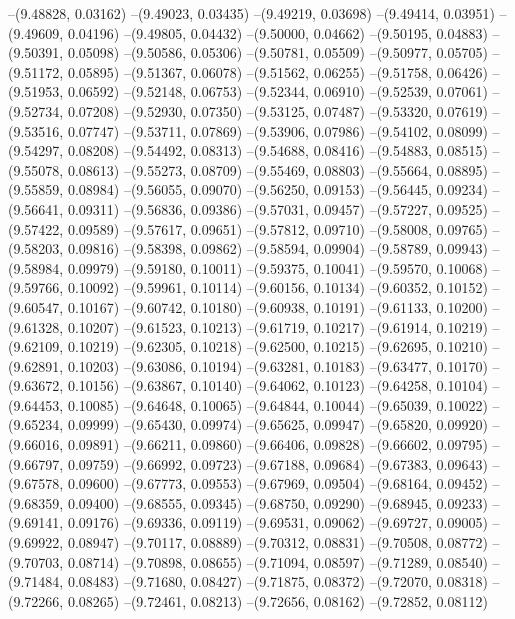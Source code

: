 --(9.48828, 0.03162)
--(9.49023, 0.03435)
--(9.49219, 0.03698)
--(9.49414, 0.03951)
--(9.49609, 0.04196)
--(9.49805, 0.04432)
--(9.50000, 0.04662)
--(9.50195, 0.04883)
--(9.50391, 0.05098)
--(9.50586, 0.05306)
--(9.50781, 0.05509)
--(9.50977, 0.05705)
--(9.51172, 0.05895)
--(9.51367, 0.06078)
--(9.51562, 0.06255)
--(9.51758, 0.06426)
--(9.51953, 0.06592)
--(9.52148, 0.06753)
--(9.52344, 0.06910)
--(9.52539, 0.07061)
--(9.52734, 0.07208)
--(9.52930, 0.07350)
--(9.53125, 0.07487)
--(9.53320, 0.07619)
--(9.53516, 0.07747)
--(9.53711, 0.07869)
--(9.53906, 0.07986)
--(9.54102, 0.08099)
--(9.54297, 0.08208)
--(9.54492, 0.08313)
--(9.54688, 0.08416)
--(9.54883, 0.08515)
--(9.55078, 0.08613)
--(9.55273, 0.08709)
--(9.55469, 0.08803)
--(9.55664, 0.08895)
--(9.55859, 0.08984)
--(9.56055, 0.09070)
--(9.56250, 0.09153)
--(9.56445, 0.09234)
--(9.56641, 0.09311)
--(9.56836, 0.09386)
--(9.57031, 0.09457)
--(9.57227, 0.09525)
--(9.57422, 0.09589)
--(9.57617, 0.09651)
--(9.57812, 0.09710)
--(9.58008, 0.09765)
--(9.58203, 0.09816)
--(9.58398, 0.09862)
--(9.58594, 0.09904)
--(9.58789, 0.09943)
--(9.58984, 0.09979)
--(9.59180, 0.10011)
--(9.59375, 0.10041)
--(9.59570, 0.10068)
--(9.59766, 0.10092)
--(9.59961, 0.10114)
--(9.60156, 0.10134)
--(9.60352, 0.10152)
--(9.60547, 0.10167)
--(9.60742, 0.10180)
--(9.60938, 0.10191)
--(9.61133, 0.10200)
--(9.61328, 0.10207)
--(9.61523, 0.10213)
--(9.61719, 0.10217)
--(9.61914, 0.10219)
--(9.62109, 0.10219)
--(9.62305, 0.10218)
--(9.62500, 0.10215)
--(9.62695, 0.10210)
--(9.62891, 0.10203)
--(9.63086, 0.10194)
--(9.63281, 0.10183)
--(9.63477, 0.10170)
--(9.63672, 0.10156)
--(9.63867, 0.10140)
--(9.64062, 0.10123)
--(9.64258, 0.10104)
--(9.64453, 0.10085)
--(9.64648, 0.10065)
--(9.64844, 0.10044)
--(9.65039, 0.10022)
--(9.65234, 0.09999)
--(9.65430, 0.09974)
--(9.65625, 0.09947)
--(9.65820, 0.09920)
--(9.66016, 0.09891)
--(9.66211, 0.09860)
--(9.66406, 0.09828)
--(9.66602, 0.09795)
--(9.66797, 0.09759)
--(9.66992, 0.09723)
--(9.67188, 0.09684)
--(9.67383, 0.09643)
--(9.67578, 0.09600)
--(9.67773, 0.09553)
--(9.67969, 0.09504)
--(9.68164, 0.09452)
--(9.68359, 0.09400)
--(9.68555, 0.09345)
--(9.68750, 0.09290)
--(9.68945, 0.09233)
--(9.69141, 0.09176)
--(9.69336, 0.09119)
--(9.69531, 0.09062)
--(9.69727, 0.09005)
--(9.69922, 0.08947)
--(9.70117, 0.08889)
--(9.70312, 0.08831)
--(9.70508, 0.08772)
--(9.70703, 0.08714)
--(9.70898, 0.08655)
--(9.71094, 0.08597)
--(9.71289, 0.08540)
--(9.71484, 0.08483)
--(9.71680, 0.08427)
--(9.71875, 0.08372)
--(9.72070, 0.08318)
--(9.72266, 0.08265)
--(9.72461, 0.08213)
--(9.72656, 0.08162)
--(9.72852, 0.08112)
